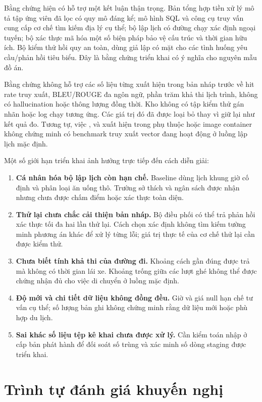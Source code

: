 Bằng chứng hiện có hỗ trợ một kết luận thận trọng. Bản tổng hợp tiền xử lý mô tả tập ứng viên đã lọc có quy mô đáng kể; mô hình SQL và công cụ truy vấn cung cấp cơ chế tìm kiếm địa lý cụ thể; bộ lập lịch có đường chạy xác định ngoại tuyến; bộ xác thực mã hóa một số biện pháp bảo vệ cấu trúc và thời gian hữu ích. Bộ kiểm thử hồi quy an toàn, dùng giả lập có mặt cho các tình huống yêu cầu/phản hồi tiêu biểu. Đây là bằng chứng triển khai có ý nghĩa cho nguyên mẫu đồ án.

Bằng chứng không hỗ trợ các số liệu từng xuất hiện trong bản nháp trước về hit rate truy xuất, BLEU/ROUGE đa ngôn ngữ, phần trăm khả thi lịch trình, không có hallucination hoặc thông lượng đồng thời. Kho không có tập kiểm thử gán nhãn hoặc log chạy tương ứng. Các giá trị đó đã được loại bỏ thay vì giữ lại như kết quả đo. Tương tự, việc ,  và  xuất hiện trong phụ thuộc hoặc image container không chứng minh có benchmark truy xuất vector đang hoạt động ở luồng lập lịch mặc định.

Một số giới hạn triển khai ảnh hưởng trực tiếp đến cách diễn giải:
\begin{enumerate}[leftmargin=1.8em,itemsep=3pt]
    \item \textbf{Cá nhân hóa bộ lập lịch còn hạn chế.} Baseline dùng lịch khung giờ cố định và phân loại ăn uống thô. Trường sở thích và ngân sách được nhận nhưng chưa được chấm điểm hoặc xác thực toàn diện.
    \item \textbf{Thử lại chưa chắc cải thiện bản nháp.} Bộ điều phối có thể trả phản hồi xác thực tối đa hai lần thử lại. Cách chọn xác định không tìm kiếm tường minh phương án khác để xử lý từng lỗi; giá trị thực tế của cơ chế thử lại cần được kiểm thử.
    \item \textbf{Chưa biết tính khả thi của đường đi.} Khoảng cách gần đúng được trả mà không có thời gian lái xe. Khoảng trống giữa các lượt ghé không thể được chứng nhận đủ cho việc di chuyển ở luồng mặc định.
    \item \textbf{Độ mới và chi tiết dữ liệu không đồng đều.} Giờ và giá null hạn chế tư vấn cụ thể; số lượng bản ghi không chứng minh rằng dữ liệu mới hoặc phù hợp du lịch.
    \item \textbf{Sai khác số liệu tệp kê khai chưa được xử lý.} Cần kiểm toán nhập ở cấp bản phát hành để đối soát số trùng và xác minh số dòng staging được triển khai.
\end{enumerate}

\section{Trình tự đánh giá khuyến nghị}

